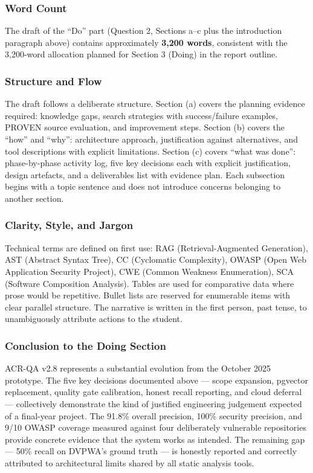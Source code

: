 \documentclass[12pt,a4paper]{article}
\begin{document}
\subsubsection{Word Count}

The draft of the ``Do'' part (Question 2, Sections a--c plus the introduction
paragraph above) contains approximately \textbf{3,200 words}, consistent with the
3,200-word allocation planned for Section 3 (Doing) in the report outline.

\subsubsection{Structure and Flow}

The draft follows a deliberate structure.  Section (a) covers the planning evidence
required: knowledge gaps, search strategies with success/failure examples, PROVEN
source evaluation, and improvement steps.  Section (b) covers the ``how'' and ``why'':
architecture approach, justification against alternatives, and tool descriptions with
explicit limitations.  Section (c) covers ``what was done'': phase-by-phase activity
log, five key decisions each with explicit justification, design artefacts, and a
deliverables list with evidence plan.  Each subsection begins with a topic sentence
and does not introduce concerns belonging to another section.

\subsubsection{Clarity, Style, and Jargon}

Technical terms are defined on first use: RAG (Retrieval-Augmented Generation), AST
(Abstract Syntax Tree), CC (Cyclomatic Complexity), OWASP (Open Web Application
Security Project), CWE (Common Weakness Enumeration), SCA (Software Composition
Analysis).  Tables are used for comparative data where prose would be repetitive.
Bullet lists are reserved for enumerable items with clear parallel structure.  The
narrative is written in the first person, past tense, to unambiguously attribute
actions to the student.

\subsubsection{Conclusion to the Doing Section}

ACR-QA v2.8 represents a substantial evolution from the October 2025 prototype.  The
five key decisions documented above --- scope expansion, pgvector replacement,
quality gate calibration, honest recall reporting, and cloud deferral --- collectively
demonstrate the kind of justified engineering judgement expected of a final-year
project.  The 91.8\% overall precision, 100\% security precision, and 9/10 OWASP
coverage measured against four deliberately vulnerable repositories provide concrete
evidence that the system works as intended.  The remaining gap --- 50\% recall on
DVPWA's ground truth --- is honestly reported and correctly attributed to
architectural limits shared by all static analysis tools.
\end{document}
